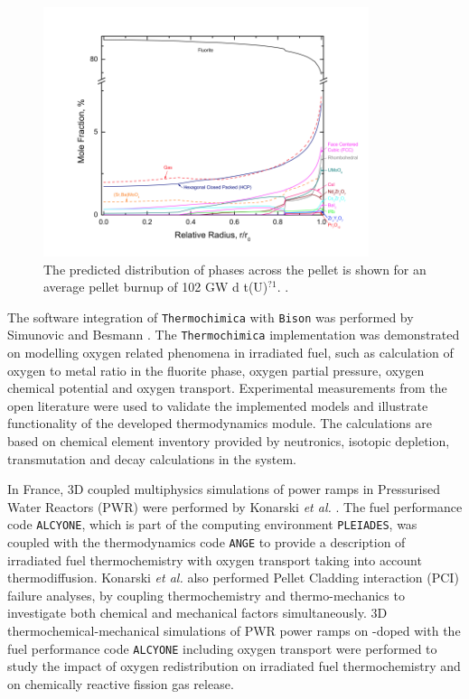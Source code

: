 	\begin{figure}[htbp]
		\begin{center}
		\includegraphics[width=0.85\textwidth]{figures/Piro_JNM}
		\caption{The predicted distribution of phases across the pellet is shown for an average pellet burnup of 102 GW d t(U)$^{?1}$. \cite{Piro13b}.}
		\label{fig:pirojnm}
		\end{center}
	\end{figure}

	The software integration of \texttt{Thermochimica} with \texttt{Bison} was performed by Simunovic and Besmann \cite{Besmann16}. The \texttt{Thermochimica} implementation was demonstrated on modelling oxygen related phenomena in irradiated fuel, such as calculation of oxygen to metal ratio in the fluorite phase, oxygen partial pressure, oxygen chemical potential and oxygen transport. Experimental measurements from the open literature were used to validate the implemented models and illustrate functionality of the developed thermodynamics module. The calculations are based on chemical element inventory provided by neutronics, isotopic depletion, transmutation and decay calculations in the \cite{SCALE05} system.

	In France, 3D coupled multiphysics simulations of power ramps in Pressurised Water Reactors (PWR) were performed by Konarski \textit{et al.} \cite{KONARSKI2019104}. The fuel performance code \texttt{ALCYONE}, which is part of the computing environment \texttt{PLEIADES}, was coupled with the thermodynamics code \texttt{ANGE} to provide a description of irradiated fuel thermochemistry with oxygen transport taking into account thermodiffusion. Konarski \textit{et al.} also performed Pellet Cladding interaction (PCI) failure analyses, by coupling thermochemistry and thermo-mechanics to investigate both chemical and mechanical factors simultaneously. 3D thermochemical-mechanical simulations of PWR power ramps on -doped  with the fuel performance code \texttt{ALCYONE} including oxygen transport were performed to study the impact of oxygen redistribution on irradiated fuel thermochemistry and on chemically reactive fission gas release.

